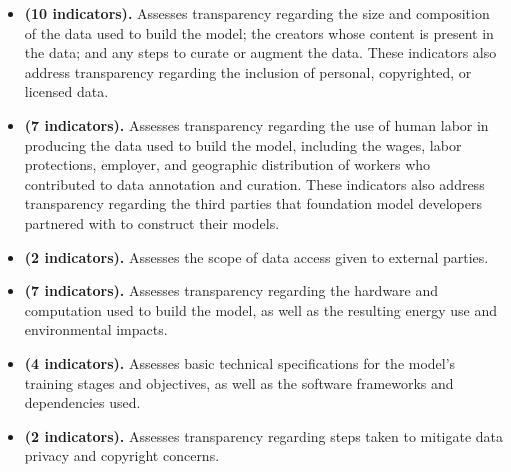 \begin{itemize}
    \item \textbf{\data (10 indicators).} 
    Assesses transparency regarding the size and composition of the data used to build the model; the creators whose content is present in the data; and any steps to curate or augment the data. 
    These indicators also address transparency regarding the inclusion of personal, copyrighted, or licensed data. 
    \item \textbf{\labor (7 indicators).} 
    Assesses transparency regarding the use of human labor in producing the data used to build the model, including the wages, labor protections, employer, and geographic distribution of workers who contributed to data annotation and curation.
    These indicators also address transparency regarding the third parties that foundation model developers partnered with to construct their models. 
    \item \textbf{\dataaccess (2 indicators).} 
    Assesses the scope of data access given to external parties.
    \item \textbf{\compute (7 indicators).} 
    Assesses transparency regarding the hardware and computation used to build the model, as well as the resulting energy use and environmental impacts.
    \item \textbf{\methods (4 indicators).} 
    Assesses basic technical specifications for the model's training stages and objectives, as well as the software frameworks and dependencies used.
    \item \textbf{\datamitigations (2 indicators).} 
    Assesses transparency regarding steps taken to mitigate data privacy and copyright concerns.
\end{itemize}


